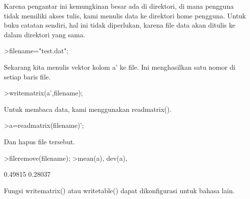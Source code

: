 \documentclass[a4paper,10pt]{article}
\begin{document}
\begin{eulernotebook}
\begin{eulercomment}
\begin{eulercomment}
\begin{eulercomment}
\begin{eulercomment}
\begin{eulercomment}
\begin{eulercomment}
\begin{eulercomment}
\begin{eulercomment}
\begin{eulercomment}
\begin{eulercomment}
\begin{eulercomment}
\begin{eulercomment}
\begin{eulercomment}
\begin{eulercomment}
\begin{eulercomment}
\begin{eulercomment}
\begin{eulercomment}
\begin{eulercomment}
\begin{eulercomment}
Karena pengantar ini kemungkinan besar ada di direktori, di mana
pengguna tidak memiliki akses tulis, kami menulis data ke direktori
home pengguna. Untuk buku catatan sendiri, hal ini tidak diperlukan,
karena file data akan ditulis ke dalam direktori yang sama.
\end{eulercomment}
\begin{eulerprompt}
>filename="test.dat";
\end{eulerprompt}
\begin{eulercomment}
Sekarang kita menulis vektor kolom a' ke file. Ini menghasilkan satu
nomor di setiap baris file.
\end{eulercomment}
\begin{eulerprompt}
>writematrix(a',filename);
\end{eulerprompt}
\begin{eulercomment}
Untuk membaca data, kami menggunakan readmatrix().
\end{eulercomment}
\begin{eulerprompt}
>a=readmatrix(filename)';
\end{eulerprompt}
\begin{eulercomment}
Dan hapus file tersebut.
\end{eulercomment}
\begin{eulerprompt}
>fileremove(filename);
>mean(a), dev(a),
\end{eulerprompt}
\begin{euleroutput}
  0.49815
  0.28037
\end{euleroutput}
\begin{eulercomment}
Fungsi writematrix() atau writetable() dapat dikonfigurasi untuk
bahasa lain.


\end{eulercomment}
\end{eulercomment}
\end{eulercomment}
\end{eulercomment}
\end{eulercomment}
\end{eulercomment}
\end{eulercomment}
\end{eulercomment}
\end{eulercomment}
\end{eulercomment}
\end{eulercomment}
\end{eulercomment}
\end{eulercomment}
\end{eulercomment}
\end{eulercomment}
\end{eulercomment}
\end{eulercomment}
\end{eulercomment}
\end{eulercomment}
\end{eulernotebook}
\end{document}
